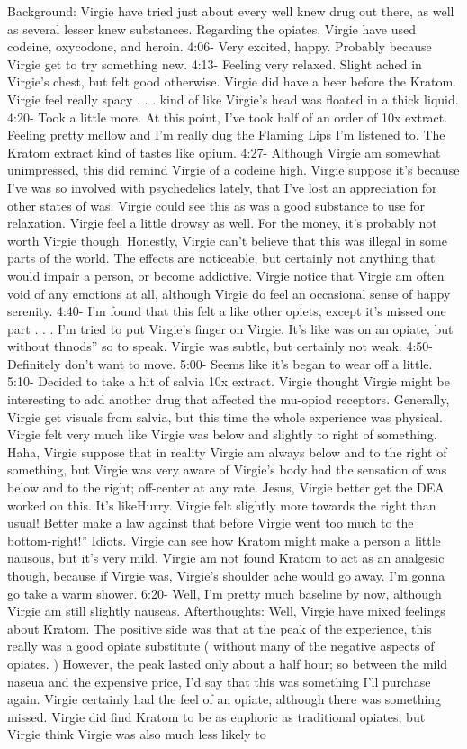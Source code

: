 \documentclass[12pt]{book}
\begin{document}
Background: Virgie have tried just about every well knew drug out there, as well as several lesser knew substances. Regarding the opiates, Virgie have used codeine, oxycodone, and heroin. 4:06- Very excited, happy. Probably because Virgie get to try something new. 4:13- Feeling very relaxed. Slight ached in Virgie's chest, but felt good otherwise. Virgie did have a beer before the Kratom. Virgie feel really spacy . . .  kind of like Virgie's head was floated in a thick liquid. 4:20- Took a little more. At this point, I've took half of an order of 10x extract. Feeling pretty mellow and I'm really dug the Flaming Lips I'm listened to. The Kratom extract kind of tastes like opium. 4:27- Although Virgie am somewhat unimpressed, this did remind Virgie of a codeine high. Virgie suppose it's because I've was so involved with psychedelics lately, that I've lost an appreciation for other states of was. Virgie could see this as was a good substance to use for relaxation. Virgie feel a little drowsy as well. For the money, it's probably not worth Virgie though. Honestly, Virgie can't believe that this was illegal in some parts of the world. The effects are noticeable, but certainly not anything that would impair a person, or become addictive. Virgie notice that Virgie am often void of any emotions at all, although Virgie do feel an occasional sense of happy serenity. 4:40- I'm found that this felt a like other opiets, except it's missed one part . . .  I'm tried to put Virgie's finger on Virgie. It's like was on an opiate, but without thnods'' so to speak. Virgie was subtle, but certainly not weak. 4:50- Definitely don't want to move. 5:00- Seems like it's began to wear off a little. 5:10- Decided to take a hit of salvia 10x extract. Virgie thought Virgie might be interesting to add another drug that affected the mu-opiod receptors. Generally, Virgie get visuals from salvia, but this time the whole experience was physical. Virgie felt very much like Virgie was below and slightly to right of something. Haha, Virgie suppose that in reality Virgie am always below and to the right of something, but Virgie was very aware of Virgie's body had the sensation of was below and to the right; off-center at any rate. Jesus, Virgie better get the DEA worked on this. It's likeHurry. Virgie felt slightly more towards the right than usual! Better make a law against that before Virgie went too much to the bottom-right!'' Idiots. Virgie can see how Kratom might make a person a little nausous, but it's very mild. Virgie am not found Kratom to act as an analgesic though, because if Virgie was, Virgie's shoulder ache would go away. I'm gonna go take a warm shower. 6:20- Well, I'm pretty much baseline by now, although Virgie am still slightly nauseas. Afterthoughts: Well, Virgie have mixed feelings about Kratom. The positive side was that at the peak of the experience, this really was a good opiate substitute ( without many of the negative aspects of opiates. ) However, the peak lasted only about a half hour; so between the mild naseua and the expensive price, I'd say that this was something I'll purchase again. Virgie certainly had the feel of an opiate, although there was something missed. Virgie did find Kratom to be as euphoric as traditional opiates, but Virgie think Virgie was also much less likely to 
\end{document}
